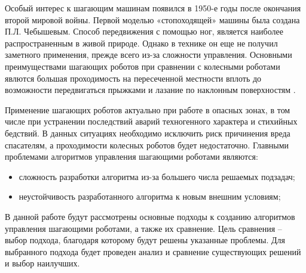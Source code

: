 
Особый интерес к шагающим машинам появился в 1950-е годы после окончания второй мировой войны. Первой моделью «стопоходящей» машины была создана П.Л. Чебышевым. 
Способ передвижения с помощью ног, является наиболее распространенным в живой природе. 
Однако в технике он еще не получил заметного применения, прежде всего из-за сложности управления.
Основными преимуществами шагающих роботов при сравнении с колесными роботами явлются большая проходимость на пересеченной местности вплоть до возможности передвигаться прыжками и лазание по наклонным поверхностям \cite{urevich}. 

Применение шагающих роботов актуально при работе в опасных зонах, в том числе при устранении последствий аварий техногенного характера и стихийных бедствий. 
В данных ситуациях необходимо исключить риск причинения вреда спасателям, а проходимости колесных роботов будет недостаточно.
Главными проблемами алгоритмов управления шагающими роботами являются:
\begin{itemize}
	\item сложность разработки алгоритма из-за большего числа решаемых подзадач;
	\item неустойчивость разработанного алгоритма к новым внешним условиям;
\end{itemize}

В данной работе будут рассмотрены основные подходы к созданию алгоритмов управления шагающими роботами, а также их сравнение. 
Цель сравнения -- выбор подхода, благодаря которому будут решены указанные проблемы. 
Для выбранного подхода будет проведен анализ и сравнение существующих решений и выбор наилучших.

\clearpage
